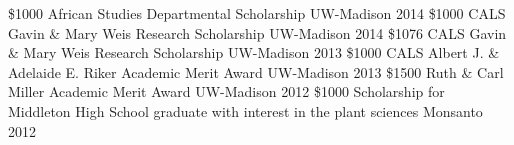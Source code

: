\begin{cvhonors}
\cvhonor
    {\$1000} %
    {African Studies Departmental Scholarship} %
    {UW-Madison} %
    {2014} %
\cvhonor
    {\$1000} %
    {CALS Gavin \& Mary Weis Research Scholarship} %
    {UW-Madison} %
    {2014} %
\cvhonor
    {\$1076} %
    {CALS Gavin \& Mary Weis Research Scholarship} %
    {UW-Madison} %
    {2013} %
\cvhonor
    {\$1000} %
    {CALS Albert J. \& Adelaide E. Riker Academic Merit Award} %
    {UW-Madison} %
    {2013} %
\cvhonor
    {\$1500} %
    {Ruth \& Carl Miller Academic Merit Award} %
    {UW-Madison} %
    {2012} %
\cvhonor
    {\$1000} %
    {Scholarship for Middleton High School graduate with interest in the plant sciences} %
    {Monsanto} %
    {2012} %
\end{cvhonors}